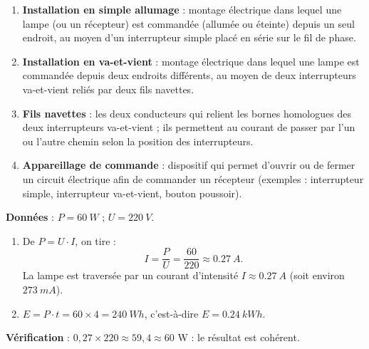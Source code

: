 \documentclass[11pt]{article}
\newcommand{\cle}[1]{{\popxbold\color{popdark}#1}}
\newcounter{popsec}
\newcounter{popsub}
\newcommand{\courssub}[1]{%
  \stepcounter{popsub}%
  \par\vspace{9pt}\noindent{\popxbold\fontsize{11.5}{13}\selectfont\color{popink}{\color{poporange}\thepopsec.\thepopsub}\hspace{6pt}#1}\par\nopagebreak\vspace{4pt}
}
\begin{document}
\begin{corrige}
\begin{enumerate}
\item \textbf{Installation en simple allumage} : montage électrique dans lequel une lampe (ou un récepteur) est commandée (allumée ou éteinte) depuis un \cle{seul endroit}, au moyen d'un interrupteur simple placé en série sur le fil de phase.
\item \textbf{Installation en va-et-vient} : montage électrique dans lequel une lampe est commandée depuis \cle{deux endroits différents}, au moyen de deux interrupteurs va-et-vient reliés par deux fils navettes.
\item \textbf{Fils navettes} : les deux conducteurs qui relient les bornes homologues des deux interrupteurs va-et-vient ; ils permettent au courant de passer par l'un ou l'autre chemin selon la position des interrupteurs.
\item \textbf{Appareillage de commande} : dispositif qui permet d'ouvrir ou de fermer un circuit électrique afin de commander un récepteur (exemples : interrupteur simple, interrupteur va-et-vient, bouton poussoir).
\end{enumerate}
\end{corrige}

\begin{corrige}
\textbf{Données} : $P = \SI{60}{W}$ ; $U = \SI{220}{V}$.
\begin{enumerate}
\item De $P = U \cdot I$, on tire :
\[ I = \frac{P}{U} = \frac{60}{220} \approx \SI{0,27}{A}. \]
La lampe est traversée par un courant d'intensité $I \approx \SI{0,27}{A}$ (soit environ $\SI{273}{mA}$).
\item $E = P \cdot t = 60 \times 4 = \SI{240}{Wh}$, c'est-à-dire $E = \SI{0,24}{kWh}$.
\end{enumerate}
\textbf{Vérification} : $0,27 \times 220 \approx 59,4 \approx 60$ W : le résultat est cohérent.
\end{corrige}

\courssub{Je m'entraîne}
\end{document}
